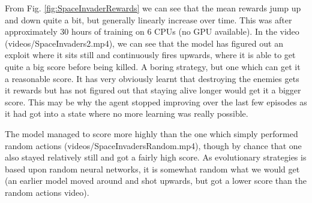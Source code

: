\documentclass[a4pape, 11pt, english]{article}
\begin{document}

From Fig. \ref{fig:SpaceInvaderRewards} we can see that the mean rewards jump up and down quite a bit, but generally linearly increase over time. This was after approximately 30 hours of training on 6 CPUs (no GPU available). In the video (videos/SpaceInvaders2.mp4), we can see that the model has figured out an exploit where it sits still and continuously fires upwards, where it is able to get quite a big score before being killed. A boring strategy, but one which can get it a reasonable score. It has very obviously learnt that destroying the enemies gets it rewards but has not figured out that staying alive longer would get it a bigger score. This may be why the agent stopped improving over the last few episodes as it had got into a state where no more learning was really possible.

The model managed to score more highly than the one which simply performed random actions (videos/SpaceInvadersRandom.mp4), though by chance that one also stayed relatively still and got a fairly high score. As evolutionary strategies is based upon random neural networks, it is somewhat random what we would get (an earlier model moved around and shot upwards, but got a lower score than the random actions video).
\end{document}
